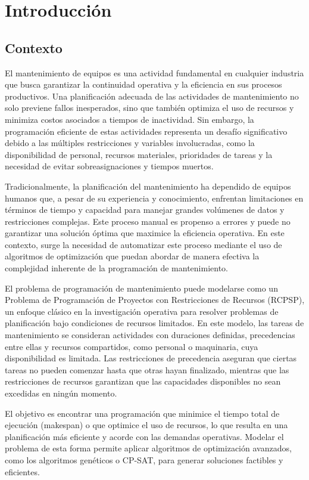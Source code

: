 \documentclass{article}
\begin{document}
\section{Introducción}
\subsection{Contexto}
El mantenimiento de equipos es una actividad fundamental en cualquier industria que busca garantizar la continuidad operativa y la eficiencia en sus procesos productivos. Una planificación adecuada de las actividades de mantenimiento no solo previene fallos inesperados, sino que también optimiza el uso de recursos y minimiza costos asociados a tiempos de inactividad. Sin embargo, la programación eficiente de estas actividades representa un desafío significativo debido a las múltiples restricciones y variables involucradas, como la disponibilidad de personal, recursos materiales, prioridades de tareas y la necesidad de evitar sobreasignaciones y tiempos muertos.

Tradicionalmente, la planificación del mantenimiento ha dependido de equipos humanos que, a pesar de su experiencia y conocimiento, enfrentan limitaciones en términos de tiempo y capacidad para manejar grandes volúmenes de datos y restricciones complejas. Este proceso manual es propenso a errores y puede no garantizar una solución óptima que maximice la eficiencia operativa. En este contexto, surge la necesidad de automatizar este proceso mediante el uso de algoritmos de optimización que puedan abordar de manera efectiva la complejidad inherente de la programación de mantenimiento.

El problema de programación de mantenimiento puede modelarse como un Problema de Programación de Proyectos con Restricciones de Recursos (RCPSP), un enfoque clásico en la investigación operativa para resolver problemas de planificación bajo condiciones de recursos limitados. En este modelo, las tareas de mantenimiento se consideran actividades con duraciones definidas, precedencias entre ellas y recursos compartidos, como personal o maquinaria, cuya disponibilidad es limitada. Las restricciones de precedencia aseguran que ciertas tareas no pueden comenzar hasta que otras hayan finalizado, mientras que las restricciones de recursos garantizan que las capacidades disponibles no sean excedidas en ningún momento. 

El objetivo es encontrar una programación que minimice el tiempo total de ejecución (makespan) o que optimice el uso de recursos, lo que resulta en una planificación más eficiente y acorde con las demandas operativas. Modelar el problema de esta forma permite aplicar algoritmos de optimización avanzados, como los algoritmos genéticos o CP-SAT, para generar soluciones factibles y eficientes.
\end{document}
